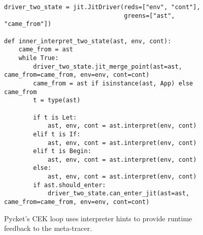 \begin{figure}[!htbp]                    %
  \centering
  \begin{minipage}{0.9\textwidth}
\begin{lstlisting}[style=python-style]
driver_two_state = jit.JitDriver(reds=["env", "cont"],
                                 greens=["ast", "came_from"])

def inner_interpret_two_state(ast, env, cont):
    came_from = ast
    while True:
        driver_two_state.jit_merge_point(ast=ast, came_from=came_from, env=env, cont=cont)
        came_from = ast if isinstance(ast, App) else came_from
        t = type(ast)

        if t is Let:
            ast, env, cont = ast.interpret(env, cont)
        elif t is If:
            ast, env, cont = ast.interpret(env, cont)
        elif t is Begin:
            ast, env, cont = ast.interpret(env, cont)
        else:
            ast, env, cont = ast.interpret(env, cont)
        if ast.should_enter:
            driver_two_state.can_enter_jit(ast=ast, came_from=came_from, env=env, cont=cont)
\end{lstlisting}
  \end{minipage}
  \caption{Pycket's CEK loop uses interpreter hints to provide runtime feedback to the meta-tracer.}
  \label{fig:pycket-annotated-cek}
\end{figure}
